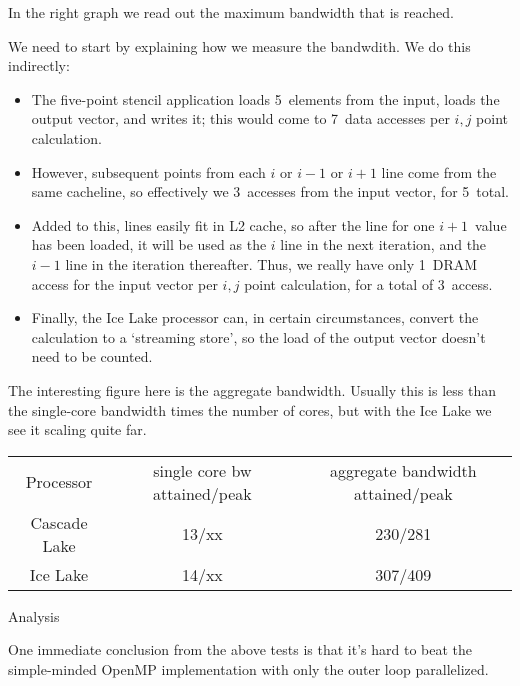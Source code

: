 In the right graph we read out the maximum bandwidth that is reached.

We need to start by explaining how we measure the bandwdith.
We do this indirectly:
\begin{itemize}
\item The five-point stencil application loads 5~elements from the input,
  loads the output vector, and writes it; this would come to 7~data accesses per
  $i,j$ point calculation.
\item However, subsequent points from each $i$ or $i-1$ or $i+1$ line
  come from the same cacheline, so effectively we 3~accesses from the input vector,
  for 5~total.
\item Added to this, lines easily fit in L2 cache, so after the line for one
  $i+1$~value has been loaded, it will be used as the $i$ line
  in the next iteration, and the $i-1$ line in the iteration thereafter.
  Thus, we really have only 1~DRAM access for the input vector per $i,j$ point calculation,
  for a total of 3~access.
\item Finally, the Ice Lake processor can, in certain circumstances,
  convert the calculation to a `streaming store', so the load of the output vector
  doesn't need to be counted.
\end{itemize}

The interesting figure here is the aggregate bandwidth.
Usually this is less than the single-core bandwidth times the number of cores,
but with the Ice Lake we see it scaling quite far.

\begin{tabular}{ccc}
  Processor& single core bw attained/peak&aggregate bandwidth attained/peak\\
  Cascade Lake & 13/xx & 230/281\\
  Ice Lake     & 14/xx & 307/409\\
\end{tabular}

 {Analysis}

One immediate conclusion from the above tests is that it's
hard to beat the simple-minded OpenMP implementation
with only the outer loop parallelized.

